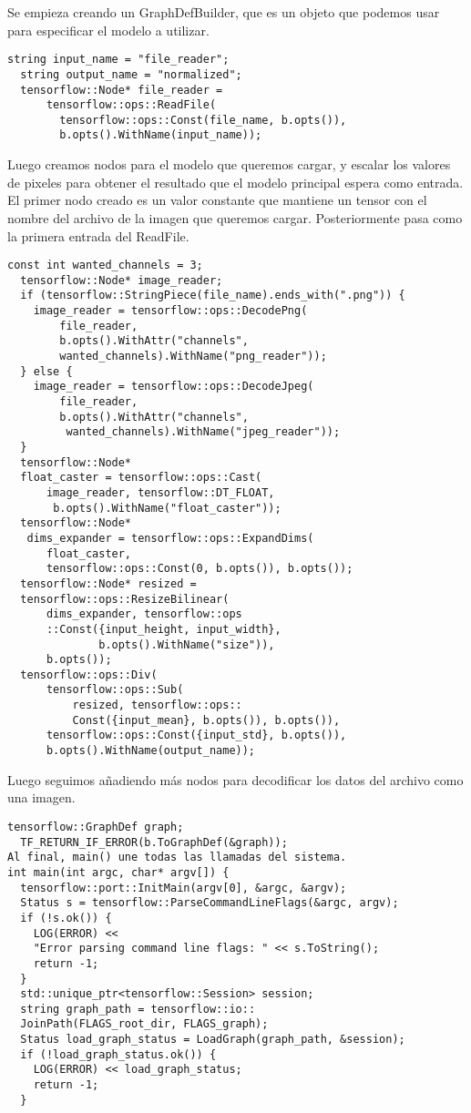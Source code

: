 \documentclass[11pt]{article}
\begin{document}
Se empieza creando un GraphDefBuilder, que es un objeto que podemos usar para especificar el modelo a utilizar.

\begin{lstlisting}
string input_name = "file_reader";
  string output_name = "normalized";
  tensorflow::Node* file_reader =
      tensorflow::ops::ReadFile(
      	tensorflow::ops::Const(file_name, b.opts()),
        b.opts().WithName(input_name));
\end{lstlisting}
Luego creamos nodos para el modelo que queremos cargar, y escalar los valores de pixeles para obtener el resultado que el modelo principal espera como entrada. El primer nodo creado es un valor constante que mantiene un tensor con el nombre del archivo de la imagen que queremos cargar. Posteriormente pasa como la primera entrada del ReadFile.

\begin{lstlisting}
const int wanted_channels = 3;
  tensorflow::Node* image_reader;
  if (tensorflow::StringPiece(file_name).ends_with(".png")) {
    image_reader = tensorflow::ops::DecodePng(
        file_reader,
        b.opts().WithAttr("channels", 
        wanted_channels).WithName("png_reader"));
  } else {
    image_reader = tensorflow::ops::DecodeJpeg(
        file_reader,
        b.opts().WithAttr("channels",
         wanted_channels).WithName("jpeg_reader"));
  }
  tensorflow::Node* 
  float_caster = tensorflow::ops::Cast(
      image_reader, tensorflow::DT_FLOAT,
       b.opts().WithName("float_caster"));
  tensorflow::Node*
   dims_expander = tensorflow::ops::ExpandDims(
      float_caster, 
      tensorflow::ops::Const(0, b.opts()), b.opts());
  tensorflow::Node* resized = 
  tensorflow::ops::ResizeBilinear(
      dims_expander, tensorflow::ops
      ::Const({input_height, input_width},
              b.opts().WithName("size")),
      b.opts());
  tensorflow::ops::Div(
      tensorflow::ops::Sub(
          resized, tensorflow::ops::
          Const({input_mean}, b.opts()), b.opts()),
      tensorflow::ops::Const({input_std}, b.opts()),
      b.opts().WithName(output_name));

\end{lstlisting}
Luego seguimos añadiendo más nodos para decodificar los datos del archivo como una imagen.

\begin{lstlisting}
tensorflow::GraphDef graph;
  TF_RETURN_IF_ERROR(b.ToGraphDef(&graph));
Al final, main() une todas las llamadas del sistema.
int main(int argc, char* argv[]) {
  tensorflow::port::InitMain(argv[0], &argc, &argv);
  Status s = tensorflow::ParseCommandLineFlags(&argc, argv);
  if (!s.ok()) {
    LOG(ERROR) << 
    "Error parsing command line flags: " << s.ToString();
    return -1;
  }
  std::unique_ptr<tensorflow::Session> session;
  string graph_path = tensorflow::io::
  JoinPath(FLAGS_root_dir, FLAGS_graph);
  Status load_graph_status = LoadGraph(graph_path, &session);
  if (!load_graph_status.ok()) {
    LOG(ERROR) << load_graph_status;
    return -1;
  }

\end{lstlisting}
\end{document}
